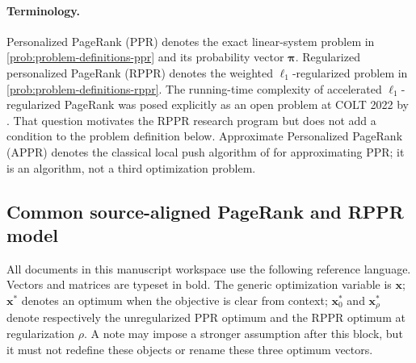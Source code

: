 \documentclass[11pt]{article}
\begin{document}
\paragraph{Terminology.}
Personalized PageRank (PPR) denotes the exact linear-system problem in
\cref{prob:problem-definitions-ppr} and its probability vector $\bm{\pi}$.
Regularized personalized PageRank (RPPR) denotes the weighted
$\ell_1$-regularized problem in \cref{prob:problem-definitions-rppr}.
The running-time complexity of accelerated $\ell_1$-regularized PageRank was
posed explicitly as an open problem at COLT 2022 by
\citet{fountoulakis2022open}. That question motivates the RPPR research
program but does not add a condition to the problem definition below.
Approximate Personalized PageRank (APPR) denotes the classical local push
algorithm of \citet{andersen2006local} for approximating PPR; it is an
algorithm, not a third optimization problem.

\subsection{Common source-aligned PageRank and RPPR model}
\label{subsec:shared-source-aligned-problem}

All documents in this manuscript workspace use the following reference
language. Vectors and matrices are typeset in bold. The generic optimization
variable is \(\bm{x}\); \(\bm{x}^*\) denotes an optimum when the objective is
clear from context; \(\bm{x}_0^*\) and \(\bm{x}_\rho^*\) denote respectively
the unregularized PPR optimum and the RPPR optimum at regularization
\(\rho\). A note may impose a stronger assumption after this block, but it
must not redefine these objects or rename these three optimum vectors.
\end{document}
